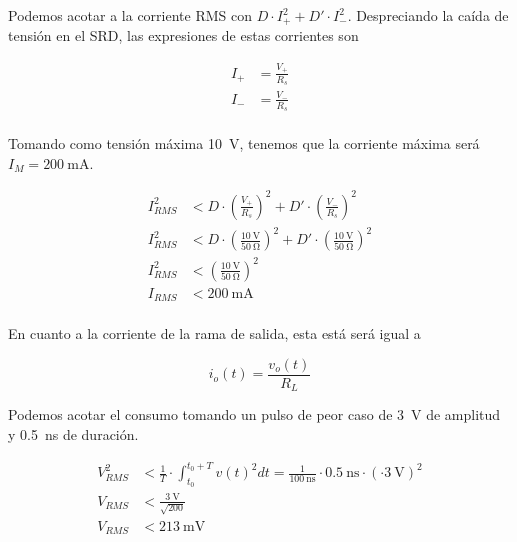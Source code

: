 Podemos acotar a la corriente RMS con $D \cdot I_+^2 + D' \cdot I_-^2$.
Despreciando la caída de tensión en el SRD, las expresiones de estas corrientes son

\begin{equation}
    \begin{aligned}
        I_+ &= \frac{V_+}{R_s} \\
        I_- &= \frac{V_-}{R_s} \\
    \end{aligned}
\end{equation}

Tomando como tensión máxima \qty{10}{\volt}, tenemos que la corriente máxima será
$I_M = \qty{200}{\milli\ampere}$.

\begin{equation}
    \begin{aligned}
        I_{RMS}^2 &< D \cdot \left( \frac{V_+}{R_s} \right) ^2 + D' \cdot
        \left( \frac{V_-}{R_s} \right) ^2 \\
        I_{RMS}^2 &< D \cdot \left( \frac{\qty{10}{\volt}}{\qty{50}{\ohm}} \right) ^2 + D' \cdot
        \left( \frac{\qty{10}{\volt}}{\qty{50}{\ohm}} \right) ^2 \\
        I_{RMS}^2 &< \left( \frac{\qty{10}{\volt}}{\qty{50}{\ohm}} \right) ^2  \\
        I_{RMS} &< \qty{200}{\milli\ampere} \\
    \end{aligned}
\end{equation}

En cuanto a la corriente de la rama de salida, esta está será igual a

\begin{equation}
    i_o(t) = \frac{v_o(t)}{R_L}
\end{equation}

Podemos acotar el consumo tomando un pulso de peor caso de \qty{3}{\volt} de
amplitud y \qty{0.5}{\nano\second} de duración.

\begin{equation}
    \begin{aligned}
        V_{RMS}^2 &< \frac{1}{T} \cdot \int_{t_0}^{t_0+T} v(t)^2dt =
        \frac{1}{\qty{100}{\nano\second}} \cdot \qty{0.5}{\nano\second} \cdot
        \left( \cdot \qty{3}{\volt} \right )^2 \\
        V_{RMS} &< \frac{\qty{3}{\volt}}{\sqrt{200}} \\
        V_{RMS} &< \qty{213}{\milli\volt}
    \end{aligned}
\end{equation}


